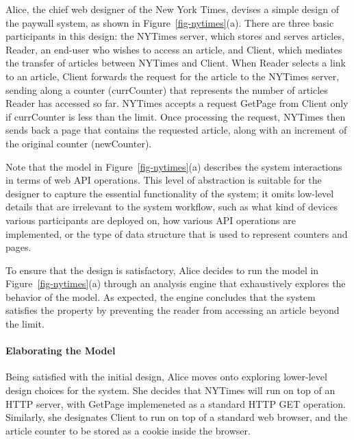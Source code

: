 Alice, the chief web designer of the New York Times, devises a simple
design of the paywall system, as shown in
Figure~\ref{fig-nytimes}(a). There are three basic participants in this
design: the \textsf{NYTimes} server, which stores and serves articles,
\textsf{Reader}, an end-user who wishes to access an article, and
\textsf{Client}, which mediates the transfer of articles between
\textsf{NYTimes} and \textsf{Client}. When \textsf{Reader} selects a
link to an article, \textsf{Client} forwards the request for the
article to the \textsf{NYTimes} server, sending along a counter
(\textsf{currCounter}) that represents the number of articles
\textsf{Reader} has accessed so far. \textsf{NYTimes} accepts a
request \textsf{GetPage} from \textsf{Client} only if
\textsf{currCounter} is less than the limit. Once processing the
request, \textsf{NYTimes} then sends back a page that contains the
requested article, along with an increment of the original counter
(\textsf{newCounter}).

Note that the model in Figure~\ref{fig-nytimes}(a) describes the system
interactions in terms of web API operations. This level of abstraction
is suitable for the designer to capture the essential functionality of
the system; it omits low-level details that are irrelevant to the
system workflow, such as what kind of devices various participants
are deployed on, how various API operations are implemented, or the
type of data structure that is used to represent counters and pages.

To ensure that the design is satisfactory, Alice decides to run the
model in Figure~\ref{fig-nytimes}(a) through an analysis engine that
exhaustively explores the behavior of the model. As expected, the
engine concludes that the system satisfies the property by preventing
the reader from accessing an article beyond the limit.

\paragraph{\textbf{Elaborating the Model}} Being satisfied with the
initial design, Alice moves onto exploring lower-level design
choices for the system. She decides that \textsf{NYTimes} will run on
top of an HTTP server, with \textsf{GetPage} implemeneted as a
standard HTTP GET operation. Similarly, she
designates \textsf{Client} to run on top of a standard web browser,
and the article counter to be stored as a cookie inside the browser.

